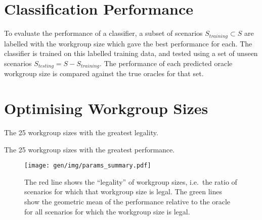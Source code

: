 

\section{Classification Performance}


To evaluate the performance of a classifier, a subset of scenarios
$S_{training} \subset S$ are labelled with the workgroup size which
gave the best performance for each. The classifier is trained on this
labelled training data, and tested using a set of unseen scenarios
$S_{testing} = S - S_{training}$. The performance of each predicted
oracle workgroup size is compared against the true oracles for that
set. %


\section{Optimising Workgroup Sizes}

%


\begin{table}
  \parbox{.45\linewidth}{
    \centering
    \scriptsize
    
    \caption{The 25 workgroup sizes with the greatest legality.}
  }
  \hfill
  \parbox{.45\linewidth}{
    \centering
    \scriptsize
    
    \caption{The 25 workgroup sizes with the greatest performance.}
  }
\end{table}


\begin{figure}
\centering
\texttt{[image: gen/img/params\_summary.pdf]}
\caption{%
  The red line shows the ``legality'' of workgroup sizes, i.e.\ the
  ratio of scenarios for which that workgroup size is legal.  The
  green lines show the geometric mean of the performance relative to
  the oracle for all scenarios for which the workgroup size is legal.%
}
\label{fig:performance-legality}
\end{figure}

